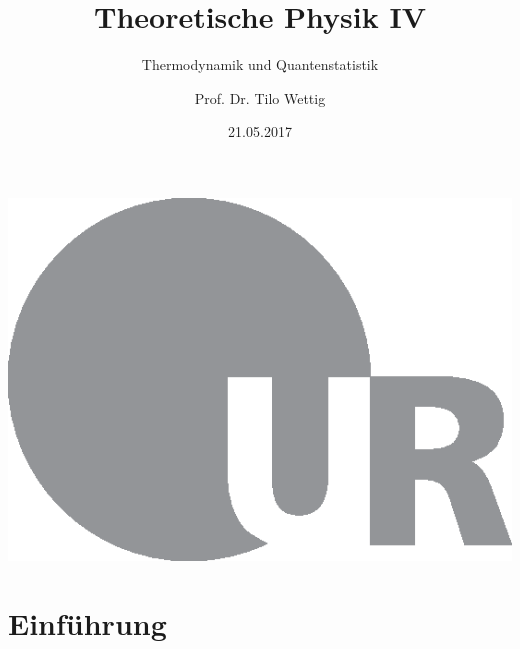 \documentclass[ngerman]{scrartcl}
\title{Theoretische Physik IV}
\subtitle{Thermodynamik und Quantenstatistik}
\author{Prof. Dr. Tilo Wettig}
\date{21.05.2017}
\begin{document}
	
	
	\maketitle
	\thispagestyle{empty}
	\vspace{2cm}
	\begin{minipage}{\linewidth}	
		\centering
		\includegraphics[width=0.4\linewidth]{LOGO_UR.eps}	
	\end{minipage}
		
	\newpage
	\tableofcontents
	\newpage
	
	\section{Einführung}
	
\end{document}
